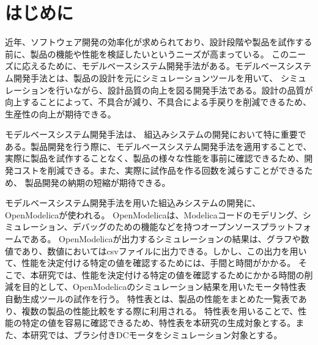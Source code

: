 \chapter{はじめに}\label{cha:Introduction}
近年、ソフトウェア開発の効率化が求められており、設計段階や製品を試作する前に、製品の機能や性能を検証したいというニーズが高まっている\cite{modelicaモデルベース本}。
このニーズに応えるために、モデルベースシステム開発手法がある\cite{modelicaモデルベース本}。モデルベースシステム開発手法とは、製品の設計を元にシミュレーションツールを用いて、
シミュレーションを行いながら、設計品質の向上を図る開発手法である\cite{ipa_2016}。設計の品質が向上することによって、不具合が減り、不具合による手戻りを削減できるため、生産性の向上が期待できる\cite{ipa_2016}。

モデルベースシステム開発手法は、 組込みシステムの開発において特に重要である\cite{ipa_useful_modelbase_dev}。製品開発を行う際に、モデルベースシステム開発手法を適用することで、
実際に製品を試作することなく、製品の様々な性能を事前に確認できるため、開発コストを削減できる\cite{modelicaモデルベース本}。また、実際に試作品を作る回数を減らすことができるため、
製品開発の納期の短縮が期待できる。

モデルベースシステム開発手法を用いた組込みシステムの開発に、OpenModelica\cite{open_modelica}が使われる。
OpenModelicaは、Modelica\cite{modelicaモデルベース本}コードのモデリング、シミュレーション、デバッグのための機能などを持つオープンソースプラットフォームである。
OpenModelicaが出力するシミュレーションの結果は、グラフや数値であり、数値においてはcsvファイルに出力できる。しかし、この出力を用いて、性能を決定付ける特定の値を確認するためには、手間と時間がかかる。
そこで、本研究では、性能を決定付ける特定の値を確認するためにかかる時間の削減を目的として、OpenModelicaのシミュレーション結果を用いたモータ特性表自動生成ツールの試作を行う。
特性表とは、製品の性能をまとめた一覧表であり、複数の製品の性能比較をする際に利用される\cite{特性表1,特性表2,特性表3,特性表4,特性表5,特性表6,特性表7,特性表8,特性表9,特性表10}。
特性表を用いることで、性能の特定の値を容易に確認できるため、特性表を本研究の生成対象とする。また、本研究では、ブラシ付きDCモータ\cite{モータ使う}をシミュレーション対象とする。



